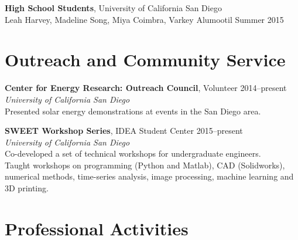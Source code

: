 \documentclass[]{res}
\begin{document}
\begin{resume}
\textbf{High School Students}, University of California San Diego \\
Leah Harvey, Madeline Song, Miya Coimbra, Varkey Alumootil \hfill Summer 2015


\section{Outreach and Community Service}
\vspace{0.1in}
%

\textbf{Center for Energy Research: Outreach Council}, Volunteer \hfill 2014--present \\
\textit{University of California San Diego} \\
Presented solar energy demonstrations at events in the San Diego area.


\textbf{SWEET Workshop Series}, IDEA Student Center \hfill 2015--present \\
\textit{University of California San Diego} \\
Co-developed a set of technical workshops for undergraduate engineers. \\
Taught workshops on programming (Python and Matlab), CAD (Solidworks),
numerical methods, time-series analysis, image processing, machine learning and
3D printing.


\section{Professional Activities}
\vspace{0.1in}


\end{resume}
\end{document}

